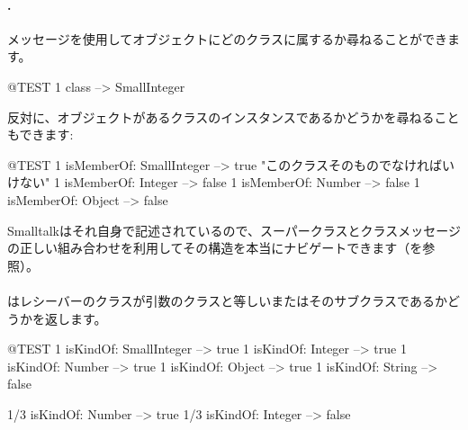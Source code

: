 \documentclass[a4paper,10pt,twoside]{book}
\begin{document}
\paragraph{.} メッセージを使用してオブジェクトにどのクラスに属するか尋ねることができます。
\begin{code}{@TEST}
1 class --> SmallInteger
\end{code}

反対に、オブジェクトがあるクラスのインスタンスであるかどうかを尋ねることもできます:
\begin{code}{@TEST}
1 isMemberOf: SmallInteger --> true    "このクラスそのものでなければいけない"
1 isMemberOf: Integer          --> false
1 isMemberOf: Number        --> false
1 isMemberOf: Object           --> false
\end{code}

Smalltalkはそれ自身で記述されているので、スーパークラスとクラスメッセージの正しい組み合わせを利用してその構造を本当にナビゲートできます（を参照）。

\paragraph{}
 はレシーバーのクラスが引数のクラスと等しいまたはそのサブクラスであるかどうかを返します。

\begin{code}{@TEST}
1 isKindOf: SmallInteger --> true
1 isKindOf: Integer          --> true
1 isKindOf: Number         --> true
1 isKindOf: Object           --> true
1 isKindOf: String            --> false

1/3 isKindOf: Number      --> true
1/3 isKindOf: Integer        --> false
\end{code}
\end{document}

